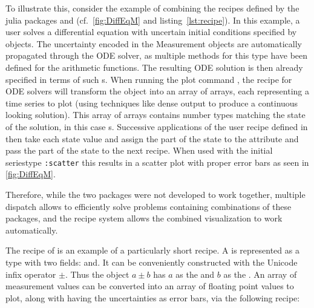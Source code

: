 \documentclass[a4paper]{article}
\begin{document}
To illustrate this, consider the example of combining the recipes defined by the julia packages\linebreak {}\cite{rackauckasSciMLDifferentialEquationsJl2022} and \cite{giordanoUncertaintyPropagationFunctionally2016} (cf.~\cref{fig:DiffEqM} and listing~\ref{lst:recipe}).
In this example, a user solves a differential equation with uncertain initial conditions specified by  objects.
The uncertainty encoded in the Measurement objects are automatically propagated through the ODE solver, as multiple methods for this type have been defined for the arithmetic functions.
The resulting ODE solution  is then already specified in terms of such \linebreak{}s.
When running the plot command , the recipe for ODE solvers will transform the  object into an array of arrays, each representing a time series to plot (using techniques like dense output to produce a continuous looking solution).
This array of arrays contains number types matching the state of the solution, in this case s.
Successive applications of the user recipe defined in  then take each state value and assign the  part of the state to the  attribute and pass the  part of the state to the next recipe.
When used with the initial seriestype \texttt{:scatter} this results in a scatter plot with proper error bars as seen in \cref{fig:DiffEqM}.

Therefore, while the two packages were not developed to work together, multiple dispatch allows to  efficiently solve problems containing combinations of these packages, and the \Plots recipe system allows the combined visualization to work automatically.

The recipe of  is an example of a particularly short recipe.
A  is represented as a type with two fields:  and\linebreak {}.
It can be conveniently constructed with the Unicode infix operator $\pm$.
Thus the object  $a \pm b$ has $a$ as the  and $b$ as the .
An array of measurement values can be converted into an array of floating point values to plot, along with having the uncertainties as error bars, via the following recipe:
\end{document}
